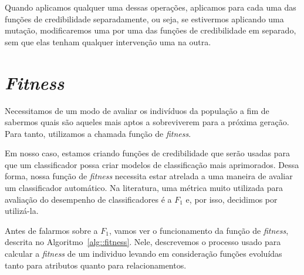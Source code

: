 Quando aplicamos qualquer uma dessas operações, aplicamos para cada uma das funções de credibilidade separadamente, ou seja, se estivermos aplicando uma mutação, modificaremos uma por uma das funções de credibilidade em separado, sem que elas tenham qualquer intervenção uma na outra.


\section{\textit{Fitness}}
\label{subsec::fitness}

Necessitamos de um modo de avaliar os indivíduos da população a fim de sabermos quais são aqueles mais aptos a sobreviverem para a próxima geração. 
Para tanto, utilizamos a chamada função de \textit{fitness}. 

Em nosso caso, estamos criando funções de credibilidade que serão usadas para que um classificador possa criar modelos de classificação mais aprimorados.
Dessa forma, nossa função de \textit{fitness} necessita estar atrelada a uma maneira de avaliar um classificador automático.
Na literatura, uma métrica muito utilizada para avaliação do desempenho de classificadores é a $F_1$ e, por isso, decidimos por utilizá-la.

Antes de falarmos sobre a $F_1$, vamos ver o funcionamento da função de \textit{fitness}, descrita no Algoritmo~\ref{alg::fitness}. 
Nele, descrevemos o processo usado para calcular a \textit{fitness} de um individuo levando em consideração funções evoluídas tanto para atributos quanto para relacionamentos.

\algrenewcommand{}
\algrenewcommand{}
\algrenewcommand{}
\algrenewcommand{}

